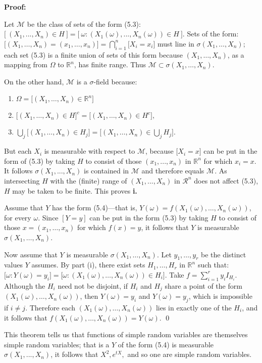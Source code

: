 \textbf{Proof: }
\vspace{-1ex}
\begin{proofline}
    Let $\mathcal{M}$ be the class of sets of the form (5.3):\\
    $\textbf{[}\ (X_1,...,X_n)\in H\ \textbf{]}=  \textbf{[}\ \omega:(X_1(\omega),...,X_n(\omega)) \in H\ \textbf{]}$. Sets of the form:\\
    $\textbf{[}(X_1, \ldots, X_n) = (x_1, \ldots, x_n)\textbf{]} = \bigcap_{i=1}^n \textbf{[}X_i = x_i\textbf{]}$ must line in $\sigma(X_1, \ldots, X_n)$; each set (5.3) is a finite union of sets of this form because $(X_1, \ldots, X_n)$, as a mapping from $\Omega$ to $\mathbb{R}^n$, has finite range. Thus $\mathcal{M} \subset \sigma(X_1, \ldots, X_n)$.

    On the other hand, $\mathcal{M}$ is a $\sigma$-field because:
    \begin{enumerate}[label=\textbf{\roman*.}, topsep=0pt, itemsep=0pt]
    \item $\Omega=\textbf{[}(X_1, \ldots, X_n) \in \mathbb{R}^n\textbf{]}$
    \item $\textbf{[}(X_1, \ldots, X_n) \in H\textbf{]}^c = \textbf{[}(X_1, \ldots, X_n) \in H^c\textbf{]},$
    \item $\bigcup_j \textbf{[}(X_1, \ldots, X_n) \in H_j\textbf{]} = \textbf{[}(X_1, \ldots, X_n) \in \bigcup_j H_j\textbf{]}.$
    \end{enumerate}
    But each $X_i$ is measurable with respect to $\mathcal{M}$, because $\textbf{[}X_i=x\textbf{]}$ can be put in the form of (5.3) by taking $H$ to consist of those $(x_1,...,x_n)$ in $\mathbb{R}^n$ for which $x_i=x$. It follows $\sigma(X_1,...,X_n)$ is contained in $\mathcal{M}$ and therefore equals $\mathcal{M}$. As intersecting $H$ with the (finite) range of $(X_1,...,X_n)$ in $\mathcal{R}^n$ does not affect (5.3), $H$ may be taken to be finite. This proves \textbf{i.}

    Assume that $Y$ has the form (5.4)—that is, $Y(\omega) = f(X_1(\omega), \ldots, X_n(\omega))$, for every $\omega$. Since $[Y = y]$ can be put in the form (5.3) by taking $H$ to consist of those $x = (x_1, \ldots, x_n)$ for which $f(x) = y$, it follows that $Y$ is measurable $\sigma(X_1, \ldots, X_n)$.

    Now assume that $Y$ is measurable $\sigma(X_1, \ldots, X_n)$. Let $y_1, \ldots, y_r$ be the distinct values $Y$ assumes. By part (i), there exist sets $H_1, \ldots, H_r$ in $\mathbb{R}^n$ such that:\\
    $\textbf{[}\omega : Y(\omega) = y_i] = [\omega : (X_1(\omega), \ldots, X_n(\omega)) \in H_i\textbf{]}$. Take $f = \sum_{i=1}^r y_i I_{H_i}$. Although the $H_i$ need not be disjoint, if $H_i$ and $H_j$ share a point of the form $(X_1(\omega), \ldots, X_n(\omega))$, then $Y(\omega) = y_i$ and $Y(\omega) = y_j$, which is impossible if $i \ne j$. Therefore each $(X_1(\omega), \ldots, X_n(\omega))$ lies in exactly one of the $H_i$, and it follows that $f(X_1(\omega), \ldots, X_n(\omega)) = Y(\omega)$. \hfill \qed
\end{proofline}

This theorem tells us that functions of simple random variables are themselves simple random variables; that is a $Y$ of the form (5.4) is  measurable $\sigma(X_1,...,X_n)$, it follows that $X^2, e^{tX},$ and so one are simple random variables.